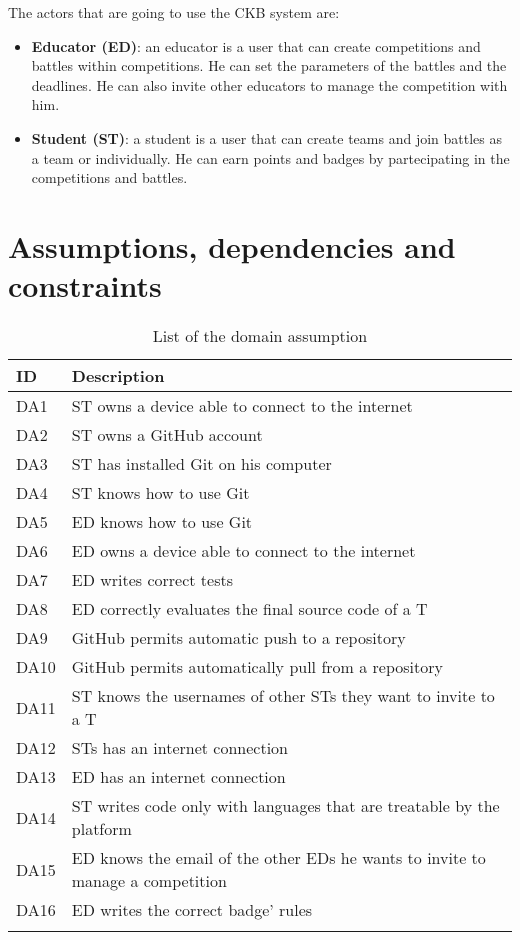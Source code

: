 The actors that are going to use the CKB system are:
\begin{itemize}
  \item \textbf{Educator (ED)}: an educator is a user that can create competitions and battles within competitions. He can set the parameters of the battles and the deadlines. He can also invite other educators to manage the competition with him.
  \item \textbf{Student (ST)}: a student is a user that can create teams and join battles as a team or individually. He can earn points and badges by partecipating in the competitions and battles.
\end{itemize}


\section{Assumptions, dependencies and constraints}
\label{s:Assumptions_dependencies_and_constraints}%

\begin{longtable}{|l|l|}
  \hline
  \textbf{ID} & \textbf{Description}      \\
  \hline
  DA1 & ST owns a device able to connect to the internet \\
  \hline
  DA2 & ST owns a GitHub account \\
  \hline
  DA3 & ST has installed Git on his computer \\
  \hline
  DA4 & ST knows how to use Git \\
  \hline
  DA5 & ED knows how to use Git \\
  \hline
  DA6 & ED owns a device able to connect to the internet \\
  \hline
  DA7 & ED writes correct tests \\ 
  \hline
  DA8 & ED correctly evaluates the final source code of a T \\
  \hline
  DA9 & GitHub permits automatic push to a repository \\
  \hline
  DA10 & GitHub permits automatically pull from a repository \\
  \hline
  DA11 & ST knows the usernames of other STs they want to invite to a T  \\
  \hline
  DA12 & STs has an internet connection \\
  \hline
  DA13 & ED has an internet connection \\
  \hline
  DA14 & ST writes code only with languages that are treatable by the platform \\
  \hline
  DA15 & ED knows the email of the other EDs he wants to invite to manage a competition \\
  \hline
  DA16 & ED writes the correct badge’ rules \\
  \hline
  \caption{List of the domain assumption}
  \label{tab:domainAssumption}
\end{longtable}